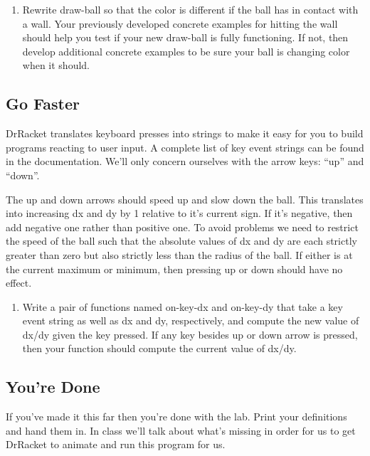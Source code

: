 \documentclass[nobib]{tufte-handout}
\begin{document}
\begin{enumerate}[resume]
  \item Rewrite draw-ball so that the color is different if the ball has in contact with a wall. Your previously developed concrete examples for hitting the wall should help you test if your new draw-ball is fully functioning.  If not, then develop additional concrete examples to be sure your ball is changing color when it should.
\end{enumerate}

\subsection*{Go Faster}

DrRacket translates keyboard presses into strings to make it easy for you to build programs reacting to user input. A complete list of key event strings can be found in the documentation. We'll only concern ourselves with the arrow keys: ``up'' and ``down''.

The up and down arrows should speed up and slow down the ball. This translates into increasing dx and dy by 1 relative to it's current sign. If it's negative, then add negative one rather than positive one. To avoid problems we need to restrict the speed of the ball such that the absolute values of dx and dy are each strictly greater than zero but also strictly less than the radius of the ball. If either is at the current maximum or minimum, then pressing up or down should have no effect.

\begin{enumerate}[resume]
  \item Write a pair of functions named on-key-dx and on-key-dy that take a key event string as well as dx and dy, respectively, and compute the new value of dx/dy given the key pressed. If any key besides up or down arrow is pressed, then your function should compute the current value of dx/dy.
\end{enumerate}

\subsection*{You're Done}

If you've made it this far then you're done with the lab. Print your definitions and hand them in. In class we'll talk about what's missing in order for us to get DrRacket to animate and run this program for us.
\end{document}
